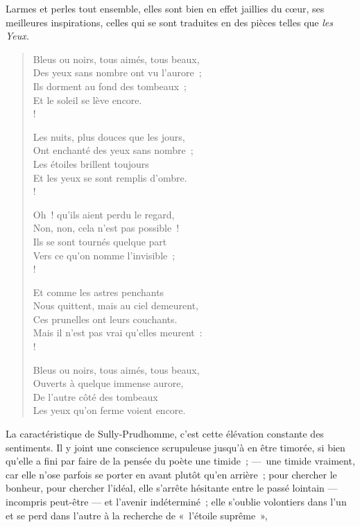 \documentclass[french,twoside]{book} %
\begin{document}
\noindent Larmes et perles tout ensemble, elles sont bien en effet jaillies du cœur, ses meilleures inspirations, celles qui se sont traduites en des pièces telles que \emph{les Yeux.}\par


\begin{verse}
Bleus ou noirs, tous aimés, tous beaux,\\
Des yeux sans nombre ont vu l’aurore ;\\
Ils dorment au fond des tombeaux ;\\
Et le soleil se lève encore.\\!

Les nuits, plus douces que les jours,\\
Ont enchanté des yeux sans nombre ;\\
Les étoiles brillent toujours\\
Et les yeux se sont remplis d’ombre.\\!

Oh ! qu’ils aient perdu le regard,\\
Non, non, cela n’est pas possible !\\
Ils se sont tournés quelque part\\
Vers ce qu’on nomme l’invisible ;\\!

Et comme les astres penchants\\
Nous quittent, mais au ciel demeurent,\\
Ces prunelles ont leurs couchants.\\
Mais il n’est pas vrai qu’elles meurent :\\!

Bleus ou noirs, tous aimés, tous beaux,\\
Ouverts à quelque immense aurore,\\
De l’autre côté des tombeaux\\
Les yeux qu’on ferme voient encore.\\
\end{verse}

\noindent La caractéristique de Sully-Prudhomme, c’est cette élévation constante des sentiments. Il y joint une conscience scrupuleuse jusqu’à en être timorée, si bien qu’elle a fini par faire de la pensée du poète une timide ; — une timide vraiment, car elle n’ose parfois se porter en avant plutôt qu’en arrière ; pour chercher le bonheur, pour chercher l’idéal, elle s’arrête hésitante entre le passé lointain — incompris peut-être — et l’avenir indéterminé ; elle s’oublie volontiers dans l’un et se perd dans l’autre à la recherche de « l’étoile suprême »,\par
\end{document}
